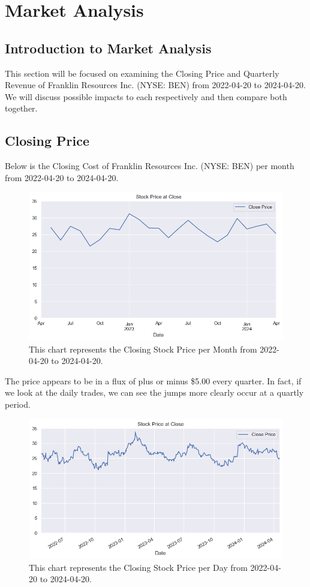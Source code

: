 \documentclass[9pt,a4paper,twoside]{tau}
\begin{document}
\section{Market Analysis}
    \subsection{Introduction to Market Analysis}
    This section will be focused on examining the Closing Price and Quarterly Revenue of Franklin Resources Inc. (NYSE: BEN) from 2022-04-20 to 2024-04-20. We will discuss possible impacts to each respectively and then compare both together. 
    
    \subsection{Closing Price}
    Below is the Closing Cost of Franklin Resources Inc. (NYSE: BEN) per month from 2022-04-20 to 2024-04-20.
        \begin{figure}[H]
            \centering
            \includegraphics[width=0.85\columnwidth]{images/CloseDataSet1mo.png}
            \caption{This chart represents the Closing Stock Price per Month from 2022-04-20 to 2024-04-20.}
            \label{fig:figure}
        \end{figure}
    The price appears to be in a flux of plus or minus \$5.00 every quarter. In fact, if we look at the daily trades, we can see the jumps more clearly occur at a quartly period. 
        \begin{figure}[H]
            \centering
            \includegraphics[width=0.85\columnwidth]{images/CloseDataSet1d.png}
            \caption{This chart represents the Closing Stock Price per Day from 2022-04-20 to 2024-04-20.}
            \label{fig:figure}
        \end{figure}
\end{document}
